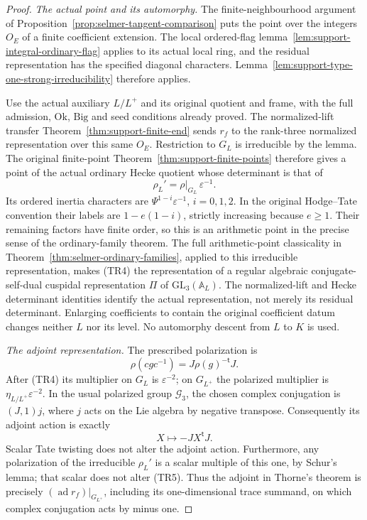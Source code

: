 \begin{proof}
\emph{The actual point and its automorphy.}
The finite-neighbourhood argument of
Proposition~\ref{prop:selmer-tangent-comparison} puts the point over
the integers $O_E$ of a finite coefficient extension.  The local
ordered-flag lemma~\ref{lem:support-integral-ordinary-flag} applies
to its actual local ring, and the residual representation has the
specified diagonal characters.  Lemma~\ref{lem:support-type-one-strong-irreducibility}
therefore applies.

Use the actual auxiliary $L/L^+$ and its original quotient and frame,
with the full admission, $\mathrm{Ok}$, $\mathrm{Big}$ and seed
conditions already proved.  The normalized-lift transfer
Theorem~\ref{thm:support-finite-end} sends $r_f$ to the rank-three
normalized representation over this same $O_E$.  Restriction to
$G_L$ is irreducible by the lemma.  The original finite-point
Theorem~\ref{thm:support-finite-points}
therefore gives a point of the actual ordinary Hecke quotient whose
determinant is that of
\[
                  \rho_L'=\rho|_{G_L}\,\varepsilon^{-1}.        \tag{TR4}
\]
Its ordered inertia characters are
$\Psi^{1-i}\varepsilon^{-1}$, $i=0,1,2$.  In the original
Hodge--Tate convention their labels are $1-e(1-i)$, strictly
increasing because $e\ge1$.  Their remaining factors have finite
order, so this is an arithmetic point in the precise sense of the
ordinary-family theorem.  The full arithmetic-point classicality in
Theorem~\ref{thm:selmer-ordinary-families}, applied to this
irreducible representation, makes (TR4) the representation of a
regular algebraic conjugate-self-dual cuspidal representation
$\Pi$ of $\mathrm{GL}_3(\mathbb A_L)$.  The normalized-lift and
Hecke determinant identities identify the actual representation,
not merely its residual determinant.  Enlarging coefficients to
contain the original coefficient datum changes neither $L$ nor its
level.  No automorphy descent from $L$ to $K$ is used.

\emph{The adjoint representation.}
The prescribed polarization is
\[
 \rho(cgc^{-1})=J\rho(g)^{-\mathsf t}J.
\]
After (TR4) its multiplier on $G_L$ is $\varepsilon^{-2}$;
on $G_{L^+}$ the polarized multiplier is
$\eta_{L/L^+}\varepsilon^{-2}$.  In the usual polarized group
$\mathcal G_3$, the chosen complex conjugation is $(J,1)j$,
where $j$ acts on the Lie algebra by negative transpose.
Consequently its adjoint action is exactly
\[
                         X\longmapsto-JX^{\mathsf t}J.           \tag{TR5}
\]
Scalar Tate twisting does not alter the adjoint action.  Furthermore,
any polarization of the irreducible $\rho_L'$ is a scalar multiple
of this one, by Schur's lemma; that scalar does not alter (TR5).
Thus the adjoint in Thorne's theorem is precisely
$(\operatorname{ad}r_f)|_{G_{L^+}}$, including its one-dimensional
trace summand, on which complex conjugation acts by minus one.


\end{proof}

